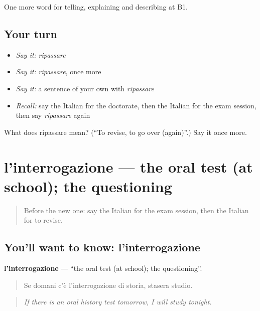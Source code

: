 \begin{grammarlens}[title={What you've built}]
One more word for telling, explaining and describing at B1.
\end{grammarlens}

\subsection*{Your turn}
\begin{itemize}
\raggedright
  \item \emph{Say it:} \emph{ripassare}
  \item \emph{Say it:} \emph{ripassare}, once more
  \item \emph{Say it:} a sentence of your own with \emph{ripassare}
  \item \emph{Recall:} say the Italian for the doctorate, then the Italian for the exam session, then say \emph{ripassare} again
\end{itemize}

\begin{tcolorbox}[breakable,colback=teal!4,colframe=teal!35!black,title={Before you move on}]
What does ripassare mean? (\textquotedblleft{}To revise, to go over (again)\textquotedblright{}.) Say it once more.
\end{tcolorbox}
\section[l'interrogazione]{l'interrogazione — the oral test (at school); the questioning}

\label{lesson:IT-C382-interrogazione}



\begin{quote}
Before the new one: say the Italian for the exam session, then the Italian for to revise.
\end{quote}

\subsection*{You'll want to know: l'interrogazione}
\textbf{l'interrogazione} — \textquotedblleft{}the oral test (at school); the questioning\textquotedblright{}.

\begin{quote}
Se domani c'è l'interrogazione di storia, stasera studio.
\end{quote}

\begin{quote}
\emph{If there is an oral history test tomorrow, I will study tonight.}
\end{quote}

